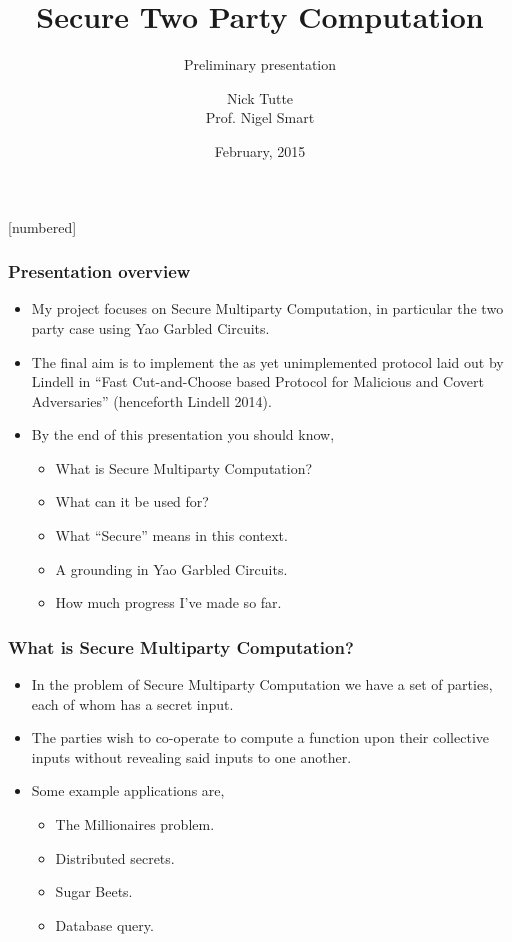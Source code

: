 \documentclass{beamer}
\begin{document}
	\title[Crisis]{Secure Two Party Computation}
	\subtitle{Preliminary presentation}
	\author[Author]{Nick Tutte\\[1ex]{\tiny Prof. Nigel Smart}}
	\date[Feb 2015]
	{February, 2015}
	\subject{Computer Science}
	\frame{\titlepage}
	[numbered]


	\begin{frame}
		\frametitle{Presentation overview}
		\begin{itemize}
			\item My project focuses on Secure Multiparty Computation, in particular the two party case using Yao Garbled Circuits.
			\item The final aim is to implement the as yet unimplemented protocol laid out by Lindell in ``Fast Cut-and-Choose based Protocol for Malicious and Covert Adversaries'' (henceforth Lindell 2014).

			\item By the end of this presentation you should know,
			\begin{itemize}
				\item What is Secure Multiparty Computation?
				\item What can it be used for?
				\item What ``Secure'' means in this context.
				\item A grounding in Yao Garbled Circuits.
				\item How much progress I've made so far.
			\end{itemize}
		\end{itemize}

	\end{frame}


	\begin{frame}
		\frametitle{What is Secure Multiparty Computation?}
		
		\begin{itemize}
			\item In the problem of Secure Multiparty Computation we have a set of parties, each of whom has a secret input.
			\item The parties wish to co-operate to compute a function upon their collective inputs without revealing said inputs to one another.
			\item Some example applications are,
			\begin{itemize}
				\item The Millionaires problem.
				\item Distributed secrets.
				\item Sugar Beets.
				\item Database query.
			\end{itemize}
		\end{itemize}
	\end{frame}
\end{document}

